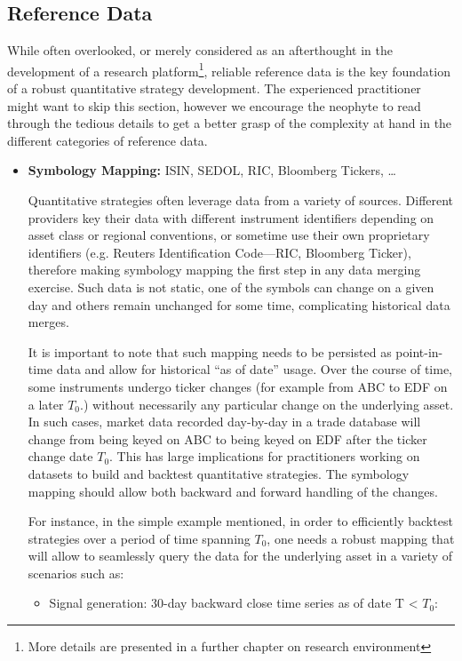 \subsection{Reference Data} 
While often overlooked, or merely considered as an afterthought in the development of a research platform\footnote{More details are presented in a further chapter on research environment}, reliable reference data is the key foundation of a robust quantitative strategy development. The experienced practitioner might want to skip this section, however we encourage the neophyte to read through the tedious details to get a better grasp of the complexity at hand in the
different categories of reference data.

\begin{itemize}
\item \textbf{Symbology Mapping:} ISIN, SEDOL, RIC, Bloomberg Tickers, \dots

Quantitative strategies often leverage data from a variety of sources. Different providers key their data with different instrument identifiers depending on asset class or regional conventions, or sometime use their own proprietary identifiers (e.g. Reuters Identification Code---RIC, Bloomberg Ticker), therefore making symbology mapping the first step in any data merging exercise. Such data is not static, one of the symbols can change on a given day and others remain unchanged for some time, complicating historical data merges.


It is important to note that such mapping needs to be persisted as point-in-time data and allow for historical ``as of date'' usage. Over the course of time, some instruments undergo ticker changes (for example from ABC to EDF on a later $T_0$.) without necessarily any particular change on the underlying asset. In such cases, market data recorded day-by-day in a trade database will change from being keyed on ABC to being keyed on EDF after the ticker change date $T_0$. This has large implications for practitioners working on datasets to build and backtest quantitative strategies. The symbology mapping should allow both backward and forward handling of the changes.


For instance, in the simple example mentioned, in order to efficiently backtest strategies over a period of time spanning $T_0$, one needs a robust mapping that will allow to seamlessly query the data for the underlying asset in a variety of scenarios such as:
\begin{itemize}
\item Signal generation: 30-day backward close time series as of date T < $T_0$:


\end{itemize}
\end{itemize}
